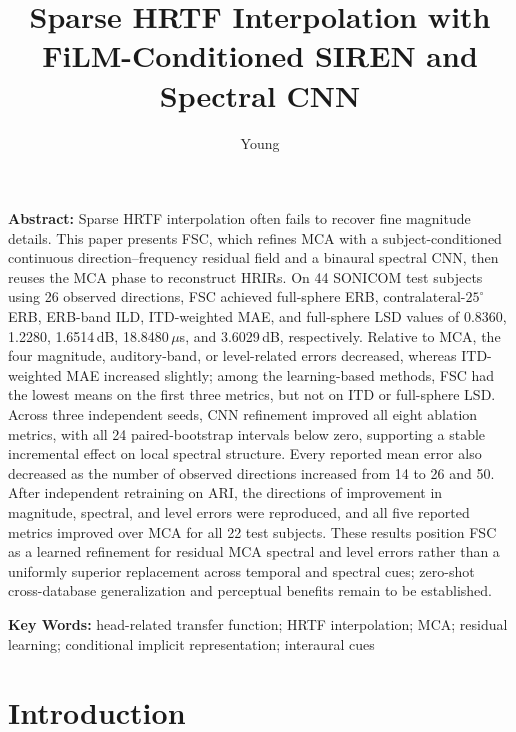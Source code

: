 \documentclass[UTF8,a4paper]{article}
\title{Sparse HRTF Interpolation with FiLM-Conditioned SIREN and Spectral CNN}
\author{Young}
\newenvironment{csmtAbstract}{\par\noindent\small{\bfseries Abstract: }}{\par}
\newenvironment{keywords}{\par\smallskip\noindent\small{\bfseries Key Words: }}{\par}
\begin{document}
\maketitle

\begin{csmtAbstract}
Sparse HRTF interpolation often fails to recover fine magnitude details. This paper presents FSC, which refines MCA with a subject-conditioned continuous direction--frequency residual field and a binaural spectral CNN, then reuses the MCA phase to reconstruct HRIRs. On 44 SONICOM test subjects using 26 observed directions, FSC achieved full-sphere ERB, contralateral-$25^\circ$ ERB, ERB-band ILD, ITD-weighted MAE, and full-sphere LSD values of 0.8360, 1.2280, 1.6514\,dB, 18.8480\,$\mu$s, and 3.6029\,dB, respectively. Relative to MCA, the four magnitude, auditory-band, or level-related errors decreased, whereas ITD-weighted MAE increased slightly; among the learning-based methods, FSC had the lowest means on the first three metrics, but not on ITD or full-sphere LSD. Across three independent seeds, CNN refinement improved all eight ablation metrics, with all 24 paired-bootstrap intervals below zero, supporting a stable incremental effect on local spectral structure. Every reported mean error also decreased as the number of observed directions increased from 14 to 26 and 50. After independent retraining on ARI, the directions of improvement in magnitude, spectral, and level errors were reproduced, and all five reported metrics improved over MCA for all 22 test subjects. These results position FSC as a learned refinement for residual MCA spectral and level errors rather than a uniformly superior replacement across temporal and spectral cues; zero-shot cross-database generalization and perceptual benefits remain to be established.
\end{csmtAbstract}

\begin{keywords}
head-related transfer function; HRTF interpolation; MCA; residual learning; conditional implicit representation; interaural cues
\end{keywords}

\section{Introduction}
\label{sec:introduction}
\end{document}
